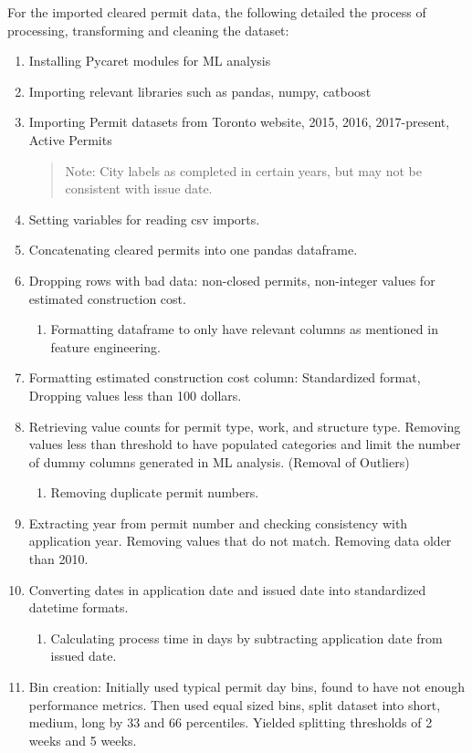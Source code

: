 \documentclass{article}
\begin{document}
For the imported cleared permit data, the following detailed the process of processing, transforming and cleaning the dataset: 
\begin{enumerate}
    \item Installing Pycaret modules for ML analysis
    \item Importing relevant libraries such as pandas, numpy, catboost
    \item Importing Permit datasets from Toronto website, 2015, 2016, 2017-present, Active Permits
    \begin{quote}
        Note: City labels as completed in certain years, but may not be consistent with issue date.
    \end{quote}
    \item Setting variables for reading csv imports.
    \item Concatenating cleared permits into one pandas dataframe.
    \item Dropping rows with bad data: non-closed permits, non-integer values for estimated construction cost.
    \begin{enumerate}
        \item Formatting dataframe to only have relevant columns as mentioned in feature engineering. 
    \end{enumerate}
    \item Formatting estimated construction cost column: Standardized format, Dropping values less than 100 dollars.
    \item Retrieving value counts for permit type, work, and structure type. Removing values less than threshold to have populated categories and limit the number of dummy columns generated in ML analysis. (Removal of Outliers)
    \begin{enumerate}
        \item Removing duplicate permit numbers. 
    \end{enumerate}
    \item Extracting year from permit number and checking consistency with application year. Removing values that do not match. Removing data older than 2010.
    \item Converting dates in application date and issued date into standardized datetime formats.
    \begin{enumerate}
        \item Calculating process time in days by subtracting application date from issued date. 
    \end{enumerate}
    \item Bin creation: Initially used typical permit day bins, found to have not enough performance metrics. Then used equal sized bins, split dataset into short, medium, long by 33 and 66 percentiles. Yielded splitting thresholds of 2 weeks and 5 weeks. 

\end{enumerate}
\end{document}
